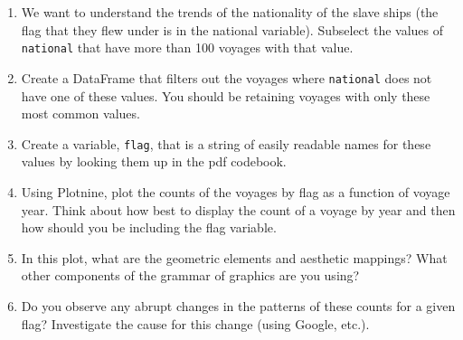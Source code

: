 \documentclass[11pt]{article}
\providecommand{\tightlist}{%
      \setlength{\itemsep}{0pt}\setlength{\parskip}{0pt}}
\begin{document}
\begin{enumerate}
\def\labelenumi{\arabic{enumi}.}
\tightlist
\item
  We want to understand the trends of the nationality of the slave ships
  (the flag that they flew under is in the national variable). Subselect
  the values of \texttt{national} that have more than 100 voyages with
  that value.\\
\item
  Create a DataFrame that filters out the voyages where
  \texttt{national} does not have one of these values. You should be
  retaining voyages with only these most common values.
\item
  Create a variable, \texttt{flag}, that is a string of easily readable
  names for these values by looking them up in the pdf codebook.
\item
  Using Plotnine, plot the counts of the voyages by flag as a function
  of voyage year. Think about how best to display the count of a voyage
  by year and then how should you be including the flag variable.
\item
  In this plot, what are the geometric elements and aesthetic mappings?
  What other components of the grammar of graphics are you using?
\item
  Do you observe any abrupt changes in the patterns of these counts for
  a given flag? Investigate the cause for this change (using Google,
  etc.).
\end{enumerate}
\end{document}
